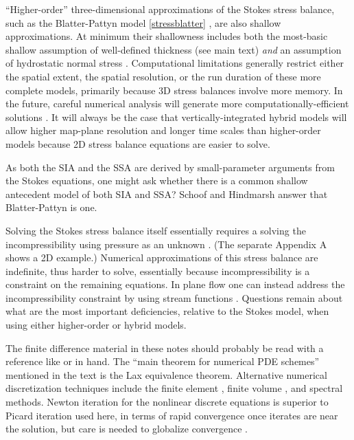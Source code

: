 \documentclass[letterpaper,final,12pt,reqno]{amsart}
\begin{document}
``Higher-order'' three-dimensional approximations of the Stokes stress balance, such as the Blatter-Pattyn model \eqref{stressblatter} \cite{Blatter,Pattyn03}, are also shallow approximations.  At minimum their shallowness includes both the most-basic shallow assumption of well-defined thickness (see main text) \emph{and} an assumption of hydrostatic normal stress \cite{GreveBlatter2009}.  Computational limitations generally restrict either the spatial extent, the spatial resolution, or the run duration of these more complete models, primarily because 3D stress balances involve more memory.  In the future, careful numerical analysis will generate more computationally-efficient solutions \cite{Brown2013}.  It will always be the case that vertically-integrated hybrid models will allow higher map-plane resolution and longer time scales than higher-order models because 2D stress balance equations are easier to solve.

As both the SIA and the SSA are derived by small-parameter arguments from the Stokes equations, one might ask whether there is a common shallow antecedent model of both SIA and SSA?  Schoof and Hindmarsh \cite{SchoofHindmarsh} answer that Blatter-Pattyn is one.

Solving the Stokes stress balance itself essentially requires a solving the incompressibility using pressure as an unknown \cite{JouvetRappaz2011,Lengetal2012,ISMIPHOM}.  (The separate Appendix A shows a 2D example.)  Numerical approximations of this stress balance are indefinite, thus harder to solve, essentially because incompressibility is a constraint on the remaining equations.  In plane flow one can instead address the incompressibility constraint by using stream functions \cite{BaliseRaymond1985}.  Questions remain about what are the most important deficiencies, relative to the Stokes model, when using either higher-order \cite{ISMIPHOM} or hybrid models.

The finite difference material in these notes should probably be read with a reference like \cite{LeVequeFD} or \cite{MortonMayers} in hand.  The ``main theorem for numerical PDE schemes'' mentioned in the text is the Lax equivalence theorem.  Alternative numerical discretization techniques include the finite element \cite{Braess}, finite volume \cite{LeVeque}, and spectral \cite{Trefethen} methods.  Newton iteration for the nonlinear discrete equations is superior to Picard iteration used here, in terms of rapid convergence once iterates are near the solution, but care is needed to globalize convergence \cite{Kelley}.
\end{document}
